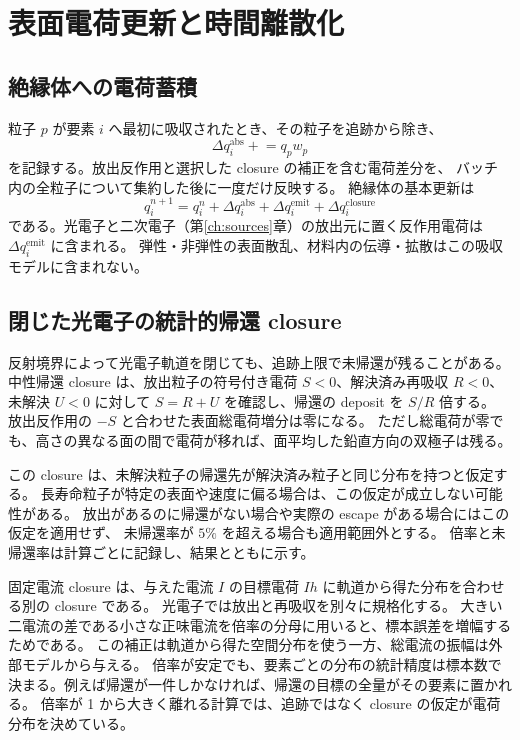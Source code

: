 \chapter{表面電荷更新と時間離散化}
\label{ch:update}

\section{絶縁体への電荷蓄積}
粒子 $p$ が要素 $i$ へ最初に吸収されたとき、その粒子を追跡から除き、
\begin{equation}
 \Delta q_i^{\mathrm{abs}}\mathrel{+}=q_p w_p
\end{equation}
を記録する。放出反作用と選択した closure の補正を含む電荷差分を、
バッチ内の全粒子について集約した後に一度だけ反映する。
絶縁体の基本更新は
\begin{equation}
 q_i^{n+1}=q_i^n+\Delta q_i^{\mathrm{abs}}
                 +\Delta q_i^{\mathrm{emit}}+\Delta q_i^{\mathrm{closure}}
 \label{eq:charge_update}
\end{equation}
である。光電子と二次電子（第\ref{ch:sources}章）の放出元に置く反作用電荷は $\Delta q_i^{\mathrm{emit}}$ に含まれる。
弾性・非弾性の表面散乱、材料内の伝導・拡散はこの吸収モデルに含まれない。

\section{閉じた光電子の統計的帰還 closure}
反射境界によって光電子軌道を閉じても、追跡上限で未帰還が残ることがある。
中性帰還 closure は、放出粒子の符号付き電荷 $S<0$、解決済み再吸収 $R<0$、
未解決 $U<0$ に対して $S=R+U$ を確認し、帰還の deposit を $S/R$ 倍する。
放出反作用の $-S$ と合わせた表面総電荷増分は零になる。
ただし総電荷が零でも、高さの異なる面の間で電荷が移れば、面平均した鉛直方向の双極子は残る。

この closure は、未解決粒子の帰還先が解決済み粒子と同じ分布を持つと仮定する。
長寿命粒子が特定の表面や速度に偏る場合は、この仮定が成立しない可能性がある。
放出があるのに帰還がない場合や実際の escape がある場合にはこの仮定を適用せず、
未帰還率が $5\%$ を超える場合も適用範囲外とする。
倍率と未帰還率は計算ごとに記録し、結果とともに示す。

固定電流 closure は、与えた電流 $I$ の目標電荷 $Ih$ に軌道から得た分布を合わせる別の closure である。
光電子では放出と再吸収を別々に規格化する。
大きい二電流の差である小さな正味電流を倍率の分母に用いると、標本誤差を増幅するためである。
この補正は軌道から得た空間分布を使う一方、総電流の振幅は外部モデルから与える。
倍率が安定でも、要素ごとの分布の統計精度は標本数で決まる。例えば帰還が一件しかなければ、帰還の目標の全量がその要素に置かれる。
倍率が 1 から大きく離れる計算では、追跡ではなく closure の仮定が電荷分布を決めている。

